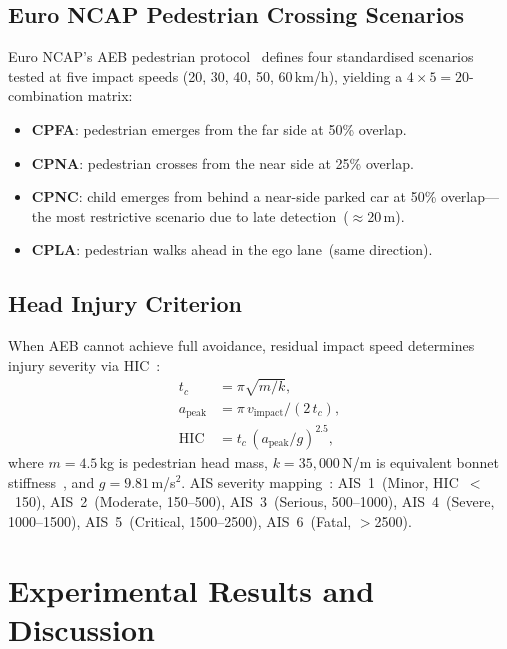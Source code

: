 \documentclass[journal]{IEEEtran}
\begin{document}
\subsection{Euro NCAP Pedestrian Crossing Scenarios}

Euro NCAP's AEB pedestrian protocol~\cite{euroncap2022} defines four
standardised scenarios tested at five impact speeds (20, 30, 40, 50,
60\,km/h), yielding a $4\times5=20$-combination matrix:
\begin{itemize}
  \item \textbf{CPFA}: pedestrian emerges from the far side at 50\%
        overlap.
  \item \textbf{CPNA}: pedestrian crosses from the near side at 25\%
        overlap.
  \item \textbf{CPNC}: child emerges from behind a near-side parked
        car at 50\% overlap---the most restrictive scenario due to
        late detection~($\approx$20\,m).
  \item \textbf{CPLA}: pedestrian walks ahead in the ego lane~(same
        direction).
\end{itemize}

\subsection{Head Injury Criterion}

When AEB cannot achieve full avoidance, residual impact speed
determines injury severity via HIC~\cite{versace1971}:
\begin{align}
  t_c      &= \pi\sqrt{m/k},           \label{eq:tc}\\
  a_\text{peak} &= \pi\,v_\text{impact}/(2\,t_c), \label{eq:apeak}\\
  \text{HIC} &= t_c\,(a_\text{peak}/g)^{2.5},     \label{eq:hic}
\end{align}
where $m=4.5$\,kg is pedestrian head mass, $k=35{,}000$\,N/m is
equivalent bonnet stiffness~\cite{untaroiu2013}, and $g=9.81$\,m/s$^2$.
AIS severity mapping~\cite{aaam2016}:
AIS~1~(Minor, HIC~$<$~150),
AIS~2~(Moderate, 150--500),
AIS~3~(Serious, 500--1000),
AIS~4~(Severe, 1000--1500),
AIS~5~(Critical, 1500--2500),
AIS~6~(Fatal, $>$2500).

\section{Experimental Results and Discussion}
\label{sec:results}
\end{document}
